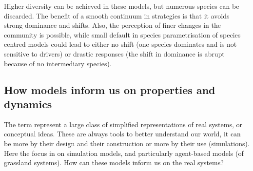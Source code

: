 Higher diversity can be achieved in these models, but numerous species can be discarded. The benefit of a smooth continuum in strategies is that it avoids strong dominance and shifts. Also, the perception of finer changes in the community is possible, while small default in species parametrisation of species centred models could lead to either no shift (one species dominates and is not sensitive to drivers) or drastic responses (the shift in dominance is abrupt because of no intermediary species). 




%



\subsection{How models inform us on properties and dynamics}

The term  represent a large class of simplified representations of real systems, or conceptual ideas. These are always tools to better understand our world, it can be more by their design and their construction or more by their use (simulations). Here the focus in on simulation models, and particularly agent-based models (of grassland systems). How can these models inform us on the real systems?

